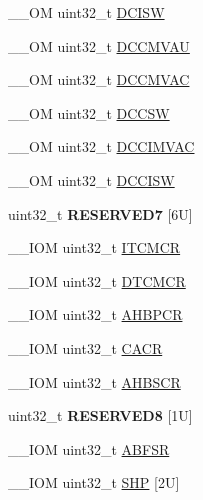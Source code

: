 \begin{DoxyCompactItemize}
\item 
\+\_\+\+\_\+\+OM uint32\+\_\+t \mbox{\hyperlink{struct_s_c_b___type_a22bcfd7e1bffebdbe98cdbc8d77a2f42}{D\+C\+I\+SW}}
\item 
\+\_\+\+\_\+\+OM uint32\+\_\+t \mbox{\hyperlink{struct_s_c_b___type_aae3caeea159ab54859ea11397f942cfa}{D\+C\+C\+M\+V\+AU}}
\item 
\+\_\+\+\_\+\+OM uint32\+\_\+t \mbox{\hyperlink{struct_s_c_b___type_a042e3622c98de4e908cfda4f70d1f097}{D\+C\+C\+M\+V\+AC}}
\item 
\+\_\+\+\_\+\+OM uint32\+\_\+t \mbox{\hyperlink{struct_s_c_b___type_ab95cc818be9fa7d25ae516f3fe6b7788}{D\+C\+C\+SW}}
\item 
\+\_\+\+\_\+\+OM uint32\+\_\+t \mbox{\hyperlink{struct_s_c_b___type_a4f59813582b53feb5f1afbbad3db2022}{D\+C\+C\+I\+M\+V\+AC}}
\item 
\+\_\+\+\_\+\+OM uint32\+\_\+t \mbox{\hyperlink{struct_s_c_b___type_af50f7a0a9574fe0e24a68bb4eca75140}{D\+C\+C\+I\+SW}}
\item 
\mbox{\label{struct_s_c_b___type_a5a892b5bc17fba63dad48a2352c26024}} 
uint32\+\_\+t {\bfseries R\+E\+S\+E\+R\+V\+E\+D7} \mbox{[}6\+U\mbox{]}
\item 
\+\_\+\+\_\+\+I\+OM uint32\+\_\+t \mbox{\hyperlink{struct_s_c_b___type_aba8abbd3db06a07b50f56547501983f9}{I\+T\+C\+M\+CR}}
\item 
\+\_\+\+\_\+\+I\+OM uint32\+\_\+t \mbox{\hyperlink{struct_s_c_b___type_a2836e932734240076ce91cf4484cdf43}{D\+T\+C\+M\+CR}}
\item 
\+\_\+\+\_\+\+I\+OM uint32\+\_\+t \mbox{\hyperlink{struct_s_c_b___type_a0d53bcea294422b5b4ecfdcd9cdc1773}{A\+H\+B\+P\+CR}}
\item 
\+\_\+\+\_\+\+I\+OM uint32\+\_\+t \mbox{\hyperlink{struct_s_c_b___type_a51f9bd107a4e1d46ba647384e5c825b5}{C\+A\+CR}}
\item 
\+\_\+\+\_\+\+I\+OM uint32\+\_\+t \mbox{\hyperlink{struct_s_c_b___type_a8c9d9eac30594dd061d34cfaacd5e4bb}{A\+H\+B\+S\+CR}}
\item 
\mbox{\label{struct_s_c_b___type_a59625ca4782dad641d92f0294c705985}} 
uint32\+\_\+t {\bfseries R\+E\+S\+E\+R\+V\+E\+D8} \mbox{[}1\+U\mbox{]}
\item 
\+\_\+\+\_\+\+I\+OM uint32\+\_\+t \mbox{\hyperlink{struct_s_c_b___type_a35a95c9a21f43a569a7ac212acb4cee7}{A\+B\+F\+SR}}
\item 
\+\_\+\+\_\+\+I\+OM uint32\+\_\+t \mbox{\hyperlink{struct_s_c_b___type_a5c40d124f95a3f7f431a3d5409d6ad28}{S\+HP}} \mbox{[}2\+U\mbox{]}

\end{DoxyCompactItemize}
